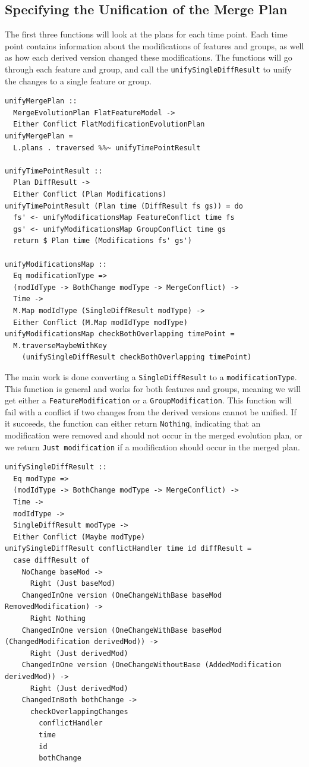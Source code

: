 \documentclass[a4paper,english]{ifimaster}
\begin{document}
\subsection{Specifying the Unification of the Merge Plan}%
\label{sub:specifying_the_unification_of_the_merge_plan}

The first three functions will look at the plans for each time point. Each time point contains information about the modifications of features and groups, as well as how each derived version changed these modifications. The functions will go through each feature and group, and call the \texttt{unify\-Single\-Diff\-Result} to unify the changes to a single feature or group.

\begin{verbatim}
unifyMergePlan ::
  MergeEvolutionPlan FlatFeatureModel ->
  Either Conflict FlatModificationEvolutionPlan
unifyMergePlan =
  L.plans . traversed %%~ unifyTimePointResult

unifyTimePointResult ::
  Plan DiffResult ->
  Either Conflict (Plan Modifications)
unifyTimePointResult (Plan time (DiffResult fs gs)) = do
  fs' <- unifyModificationsMap FeatureConflict time fs
  gs' <- unifyModificationsMap GroupConflict time gs
  return $ Plan time (Modifications fs' gs')

unifyModificationsMap ::
  Eq modificationType =>
  (modIdType -> BothChange modType -> MergeConflict) ->
  Time ->
  M.Map modIdType (SingleDiffResult modType) ->
  Either Conflict (M.Map modIdType modType)
unifyModificationsMap checkBothOverlapping timePoint =
  M.traverseMaybeWithKey
    (unifySingleDiffResult checkBothOverlapping timePoint)
\end{verbatim}

The main work is done converting a \texttt{Single\-Diff\-Result} to a \texttt{modification\-Type}. This function is general and works for both features and groups, meaning we will get either a \texttt{Feature\-Modification} or a \texttt{Group\-Modification}. This function will fail with a conflict if two changes from the derived versions cannot be unified. If it succeeds, the function can either return \texttt{Nothing}, indicating that an modification were removed and should not occur in the merged evolution plan, or we return \texttt{Just modification} if a modification should occur in the merged plan.

\begin{verbatim}
unifySingleDiffResult ::
  Eq modType =>
  (modIdType -> BothChange modType -> MergeConflict) ->
  Time ->
  modIdType ->
  SingleDiffResult modType ->
  Either Conflict (Maybe modType)
unifySingleDiffResult conflictHandler time id diffResult =
  case diffResult of
    NoChange baseMod ->
      Right (Just baseMod)
    ChangedInOne version (OneChangeWithBase baseMod RemovedModification) ->
      Right Nothing
    ChangedInOne version (OneChangeWithBase baseMod (ChangedModification derivedMod)) ->
      Right (Just derivedMod)
    ChangedInOne version (OneChangeWithoutBase (AddedModification derivedMod)) ->
      Right (Just derivedMod)
    ChangedInBoth bothChange ->
      checkOverlappingChanges
        conflictHandler
        time
        id
        bothChange
\end{verbatim}
\end{document}
